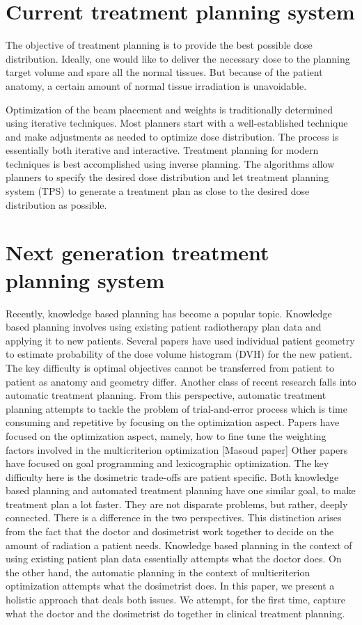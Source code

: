 \section{Current treatment planning system}
The objective of treatment planning is to provide the best possible dose distribution. Ideally, one would like to deliver the necessary dose to the planning target volume and spare all the normal tissues. But because of the patient anatomy, a certain amount of normal tissue irradiation is unavoidable.  

Optimization of the beam placement and weights is traditionally determined using iterative techniques. Most planners start with a well-established technique and make adjustments as needed to optimize dose distribution. The process is essentially both iterative and interactive. Treatment planning for modern techniques is best accomplished using inverse planning. The algorithms allow planners to specify the desired dose distribution and let treatment planning system (TPS) to generate a treatment plan as close to the desired dose distribution as possible. 


\section{Next generation treatment planning system}
Recently, knowledge based planning has become a popular topic. Knowledge based planning involves using existing patient radiotherapy plan data and applying it to new patients. Several papers have used individual patient geometry to estimate probability of the dose volume histogram (DVH) for the new patient. The key difficulty is optimal objectives cannot be transferred from patient to patient as anatomy and geometry differ.
Another class of recent research falls into automatic treatment planning. From this perspective, automatic treatment planning attempts to tackle the problem of trial-and-error process which is time consuming and repetitive by focusing on the optimization aspect.  Papers have focused on the optimization aspect, namely, how to fine tune the weighting factors involved in the multicriterion optimization [Masoud paper] Other papers have focused on goal programming and lexicographic optimization. The key difficulty here is the dosimetric trade-offs are patient specific.
Both knowledge based planning and automated treatment planning have one similar goal, to make treatment plan a lot faster. They are not disparate problems, but rather, deeply connected. There is a difference in the two perspectives. This distinction arises from the fact that the doctor and dosimetrist work together to decide on the amount of radiation a patient needs. Knowledge based planning in the context of using existing patient plan data essentially attempts what the doctor does. On the other hand, the automatic planning in the context of multicriterion optimization attempts what the dosimetrist does. In this paper, we present a holistic approach that deals both issues. We attempt, for the first time, capture what the doctor and the dosimetrist do together in clinical treatment planning.
